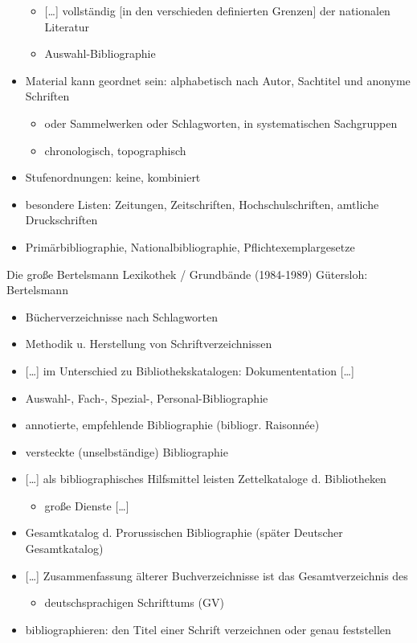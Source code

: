 \documentclass[a4paper,
fontsize=11pt,
oneside,
numbers=noperiodatend,
parskip=half-,
bibliography=totoc,
final
]{scrartcl}
\providecommand{\tightlist}{%
  \setlength{\itemsep}{0pt}\setlength{\parskip}{0pt}}
\begin{document}
\begin{itemize}
  \begin{itemize}
  \item
    {[}\ldots{}{]} vollständig {[}in den verschieden definierten
    Grenzen{]} der nationalen Literatur
  \item
    Auswahl-Bibliographie
  \end{itemize}
\item
  Material kann geordnet sein: alphabetisch nach Autor, Sachtitel und
  anonyme Schriften

  \begin{itemize}
  \item
    oder Sammelwerken oder Schlagworten, in systematischen Sachgruppen
  \item
    chronologisch, topographisch
  \end{itemize}
\item
  Stufenordnungen: keine, kombiniert
\item
  besondere Listen: Zeitungen, Zeitschriften, Hochschulschriften,
  amtliche Druckschriften
\item
  Primärbibliographie, Nationalbibliographie, Pflichtexemplargesetze
\end{itemize}

Die große Bertelsmann Lexikothek / Grundbände (1984-1989) Gütersloh:
Bertelsmann

\begin{itemize}
\item
  Bücherverzeichnisse nach Schlagworten
\item
  Methodik u. Herstellung von Schriftverzeichnissen
\item
  {[}\ldots{}{]} im Unterschied zu Bibliothekskatalogen:
  Dokumententation {[}\ldots{}{]}
\item
  Auswahl-, Fach-, Spezial-, Personal-Bibliographie
\item
  annotierte, empfehlende Bibliographie (bibliogr. Raisonnée)
\item
  versteckte (unselbständige) Bibliographie
\item
  {[}\ldots{}{]} als bibliographisches Hilfsmittel leisten
  Zettelkataloge d. Bibliotheken

  \begin{itemize}
  \tightlist
  \item
    große Dienste {[}\ldots{}{]}
  \end{itemize}
\item
  Gesamtkatalog d. Prorussischen Bibliographie (später Deutscher
  Gesamtkatalog)
\item
  {[}\ldots{}{]} Zusammenfassung älterer Buchverzeichnisse ist das
  Gesamtverzeichnis des

  \begin{itemize}
  \tightlist
  \item
    deutschsprachigen Schrifttums (GV)
  \end{itemize}
\item
  bibliographieren: den Titel einer Schrift verzeichnen oder genau
  feststellen
\end{itemize}
\end{document}
